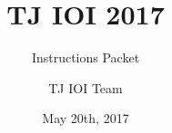 \documentclass[a4paper,11pt]{scrartcl}
\begin{document}
\title{TJ IOI 2017}
\subtitle{Instructions Packet}
\date{May 20th, 2017}

\author{TJ IOI Team}
\end{document}
